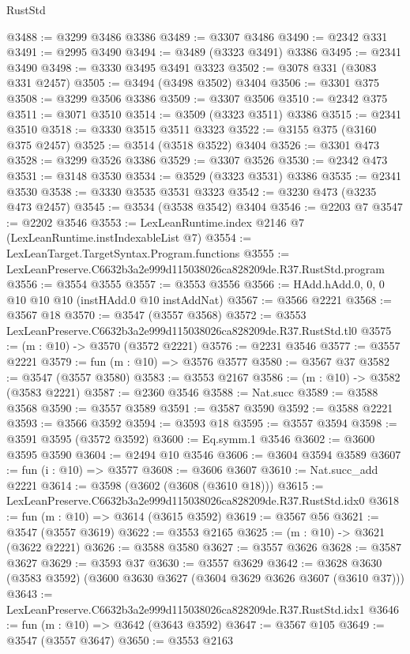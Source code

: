 \begin{lexlean}{RustStd}
\begin{coremodule}
@3488 := @3299 @3486 @3386
@3489 := @3307 @3486
@3490 := @2342 @331
@3491 := @2995 @3490
@3494 := @3489 (@3323 @3491) @3386
@3495 := @2341 @3490
@3498 := @3330 @3495 @3491 @3323
@3502 := @3078 @331 (@3083 @331 @2457)
@3505 := @3494 (@3498 @3502) @3404
@3506 := @3301 @375
@3508 := @3299 @3506 @3386
@3509 := @3307 @3506
@3510 := @2342 @375
@3511 := @3071 @3510
@3514 := @3509 (@3323 @3511) @3386
@3515 := @2341 @3510
@3518 := @3330 @3515 @3511 @3323
@3522 := @3155 @375 (@3160 @375 @2457)
@3525 := @3514 (@3518 @3522) @3404
@3526 := @3301 @473
@3528 := @3299 @3526 @3386
@3529 := @3307 @3526
@3530 := @2342 @473
@3531 := @3148 @3530
@3534 := @3529 (@3323 @3531) @3386
@3535 := @2341 @3530
@3538 := @3330 @3535 @3531 @3323
@3542 := @3230 @473 (@3235 @473 @2457)
@3545 := @3534 (@3538 @3542) @3404
@3546 := @2203 @7
@3547 := @2202 @3546
@3553 := LexLeanRuntime.index @2146 @7 (LexLeanRuntime.instIndexableList @7)
@3554 := LexLeanTarget.TargetSyntax.Program.functions
@3555 := LexLeanPreserve.C6632b3a2e999d115038026ca828209de.R37.RustStd.program
@3556 := @3554 @3555
@3557 := @3553 @3556
@3566 := HAdd.hAdd.{0, 0, 0} @10 @10 @10 (instHAdd.{0} @10 instAddNat)
@3567 := @3566 @2221
@3568 := @3567 @18
@3570 := @3547 (@3557 @3568)
@3572 := @3553 LexLeanPreserve.C6632b3a2e999d115038026ca828209de.R37.RustStd.tl0
@3575 := (m : @10) -> @3570 (@3572 @2221)
@3576 := @2231 @3546
@3577 := @3557 @2221
@3579 := fun (m : @10) => @3576 @3577
@3580 := @3567 @37
@3582 := @3547 (@3557 @3580)
@3583 := @3553 @2167
@3586 := (m : @10) -> @3582 (@3583 @2221)
@3587 := @2360 @3546
@3588 := Nat.succ
@3589 := @3588 @3568
@3590 := @3557 @3589
@3591 := @3587 @3590
@3592 := @3588 @2221
@3593 := @3566 @3592
@3594 := @3593 @18
@3595 := @3557 @3594
@3598 := @3591 @3595 (@3572 @3592)
@3600 := Eq.symm.{1} @3546
@3602 := @3600 @3595 @3590
@3604 := @2494 @10 @3546
@3606 := @3604 @3594 @3589
@3607 := fun (i : @10) => @3577
@3608 := @3606 @3607
@3610 := Nat.succ_add @2221
@3614 := @3598 (@3602 (@3608 (@3610 @18)))
@3615 := LexLeanPreserve.C6632b3a2e999d115038026ca828209de.R37.RustStd.idx0
@3618 := fun (m : @10) => @3614 (@3615 @3592)
@3619 := @3567 @56
@3621 := @3547 (@3557 @3619)
@3622 := @3553 @2165
@3625 := (m : @10) -> @3621 (@3622 @2221)
@3626 := @3588 @3580
@3627 := @3557 @3626
@3628 := @3587 @3627
@3629 := @3593 @37
@3630 := @3557 @3629
@3642 := @3628 @3630 (@3583 @3592) (@3600 @3630 @3627 (@3604 @3629 @3626 @3607 (@3610 @37)))
@3643 := LexLeanPreserve.C6632b3a2e999d115038026ca828209de.R37.RustStd.idx1
@3646 := fun (m : @10) => @3642 (@3643 @3592)
@3647 := @3567 @105
@3649 := @3547 (@3557 @3647)
@3650 := @3553 @2163

\end{coremodule}
\end{lexlean}
